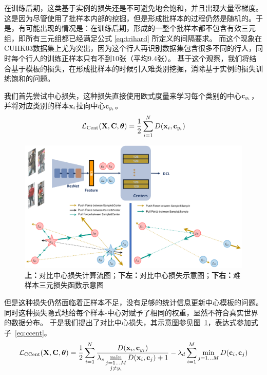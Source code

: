 在训练后期，这类基于实例的损失还是不可避免地会饱和，并且出现大量零梯度。这是因为尽管使用了批样本内部的挖掘，但是形成批样本的过程仍然是随机的。于是，有可能出现的情况是：在训练后期，形成的一整个批样本都不包含有效三元组，即所有三元组都已经满足公式
\ref{eq:trihard}
所定义的间隔要求。
而这个现象在CUHK03数据集上尤为突出，因为这个行人再识别数据集包含很多不同的行人，同时每个行人的训练正样本只有不到10张（平均9.4张）。
基于这个观察，我们将结合基于模板的损失，在形成批样本的时候引入难类别挖掘，消除基于实例的损失训练饱和的问题。

我们首先尝试中心损失，这种损失直接使用欧式度量来学习每个类别的中心${\mathbf{c}}_{y_i}$，并将对应类别的样本${\mathbf{x}}_i$拉向中心${\mathbf{c}}_{y_i}$。
\begin{equation}
	\mathcal{L}_{\textrm{Cent}} ({\mathbf{X}}, {\mathbf{C}}, {\boldsymbol{\theta}}) = \frac{1}{2}
	\sum_{i=1}^{N}  D(
	{\mathbf{x}}_i , {\mathbf{c}}_{y_i} )
\end{equation}

\begin{figure}
	\centering
	\includegraphics[width=.9\textwidth]{fig/2018-05-15-14-38-39.png}
	\caption{
		\textbf{上：}对比中心损失计算流图；\textbf{下左：}对比中心损失示意图；\textbf{下右：}难样本三元损失函数示意图
	}
	\label{fig:dcent}
\end{figure}

但是这种损失仍然面临着正样本不足，没有足够的统计信息更新中心模板的问题。
同时这种损失隐式地给每个样本-中心对赋予了相同的权重，显然不符合真实世界的数据分布。
于是我们提出了对比中心损失，其示意图参见图~\ref{fig:dcent}，表达式参加式子~\ref{eq:ccent}。
\begin{equation}
	\mathcal{L}_{\textrm{CCent}} ({\mathbf{X}}, {\mathbf{C}}, {\boldsymbol{\theta}}) = \frac{1}{2}
	\sum_{i=1}^{N}
	\frac{D(
		{\mathbf{x}}_{i}, {\mathbf{c}}_{y_i}
		)}{ 
		\displaystyle \lambda_s
		\min_{\substack{
				j=1...M \\
				j \neq y_i }}
		D(
		{\mathbf{x}}_{i}, {\mathbf{c}}_{j}
		) + 1 }
	-
	\lambda_d \sum_{i=1}^{M}  \min_{j=1...M} D({\mathbf{c}}_i,{\mathbf{c}}_j)
\label{eq:ccent}
\end{equation}

